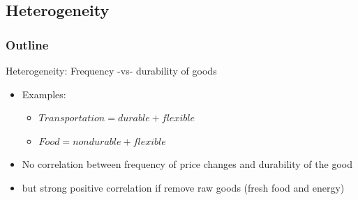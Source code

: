 \documentclass{beamer}
\begin{document}
\subsection{Heterogeneity}
\begin{frame}
\frametitle{Outline}
\tableofcontents[currentsubsection]
\end{frame}
\begin{frame}{Heterogeneity: Frequency -vs- durability of goods}


\begin{itemize}
\small
\item Examples:
\begin{itemize}
\item $Transportation=durable+flexible$
\item $Food=nondurable+flexible$
\end{itemize}
\item No correlation between frequency of price changes and durability of the good
\item but strong positive correlation if remove raw goods (fresh food and energy) 
\end{itemize}


\begin{center}

\begin{figure}[h!]

\end{figure}

\end{center}


\end{frame}
\end{document}
